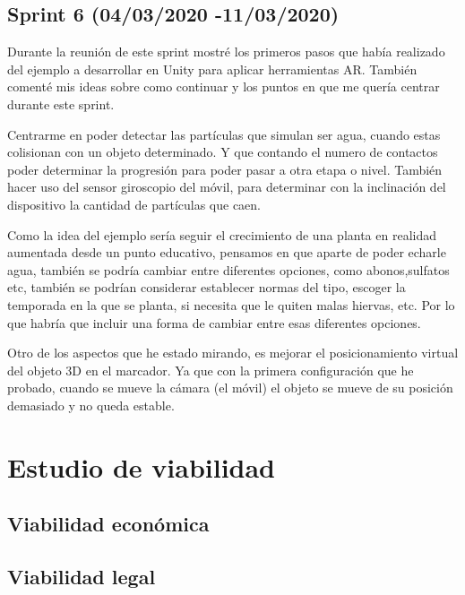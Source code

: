 \subsection{Sprint 6 (04/03/2020 -11/03/2020)}

Durante la reunión de este sprint mostré los primeros pasos que había realizado del ejemplo a desarrollar en Unity para aplicar herramientas AR. También comenté mis ideas sobre como continuar y los puntos en que me quería centrar durante este sprint.

Centrarme en poder detectar las partículas que simulan ser agua, cuando estas colisionan con un objeto determinado. Y que contando el numero de contactos poder determinar la progresión para poder pasar a otra etapa o nivel. También hacer uso del sensor giroscopio del móvil, para determinar con la inclinación del dispositivo la cantidad de partículas que caen.

Como la idea del ejemplo sería seguir el crecimiento de una planta en realidad aumentada desde un punto educativo, pensamos en que aparte de poder echarle agua, también se podría cambiar entre diferentes opciones, como abonos,sulfatos etc, también se podrían considerar establecer normas del tipo, escoger la temporada en la que se planta, si necesita que le quiten malas hiervas, etc. Por lo que habría que incluir una forma de cambiar entre esas diferentes opciones.

Otro de los aspectos que he estado mirando, es mejorar el posicionamiento virtual del objeto 3D en el marcador. Ya que con la primera configuración que he probado, cuando se mueve la cámara (el móvil) el objeto se mueve de su posición demasiado y no queda estable.

\section{Estudio de viabilidad}

\subsection{Viabilidad económica}

\subsection{Viabilidad legal}


